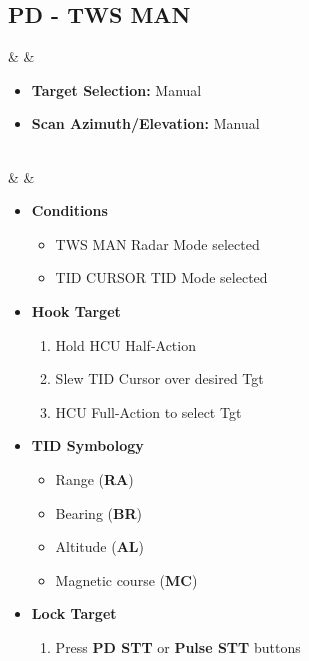 \documentclass[fontInter]{TechCheck}
\begin{document}
	\subsection{PD - TWS MAN}
	\thumbnar
	\begin{listlongtable}
		\textbf{\textbullet} &  &
		\begin{minipage}[t]{\linewidth}
			\vspace{-7pt}
			\begin{itemize}
				\item \textbf{Target Selection:} Manual
				\item \textbf{Scan Azimuth/Elevation:} Manual
			\end{itemize}
		\end{minipage} \\
		\midrule
		\textbf{\textbullet} &  &
		\begin{minipage}[t]{\linewidth}
			\vspace{-7pt}
			\begin{itemize}
				\item \textbf{Conditions}
				\begin{itemize}
					\item TWS MAN Radar Mode selected
					\item TID CURSOR TID Mode selected
				\end{itemize}
				\item \textbf{Hook Target}
				\begin{enumerate}
					\item Hold HCU Half-Action
					\item Slew TID Cursor over desired Tgt
					\item HCU Full-Action to select Tgt
				\end{enumerate}
				\item \textbf{TID Symbology}
				\begin{itemize}
					\item Range (\textbf{RA})
					\item Bearing (\textbf{BR})
					\item Altitude (\textbf{AL})
					\item Magnetic course (\textbf{MC})
				\end{itemize}
				\item \textbf{Lock Target}
				\begin{enumerate}[label=(\alph*), resume]
					\item Press \textbf{PD STT} or \textbf{Pulse STT} buttons

\end{enumerate}
\end{itemize}
\end{minipage}
\end{listlongtable}
\end{document}
